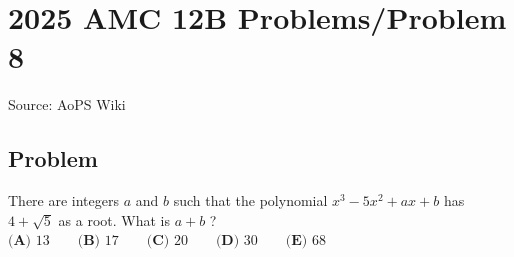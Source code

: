 \documentclass[12pt]{article}
\begin{document}
\section*{{2025 AMC 12B Problems/Problem 8}}
Source: AoPS Wiki

\subsection*{Problem}
There are integers $a$ and $b$ such that the polynomial $x^3 - 5x^2 + ax + b$ has $4+\sqrt{5}$ as a root. What is $a+b$ ? $\textbf{(A) } 13 \qquad \textbf{(B) } 17 \qquad \textbf{(C) } 20 \qquad \textbf{(D) } 30 \qquad \textbf{(E) } 68$
\end{document}
